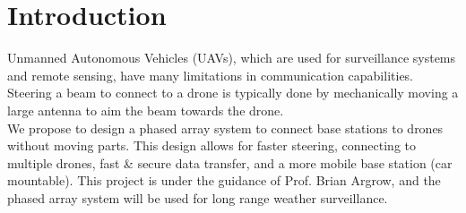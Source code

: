 \documentclass[UROP.tex]{subfiles}
\begin{document}
\bigskip
\section{\Large Introduction}
	Unmanned Autonomous Vehicles (UAVs), which are used for surveillance systems and remote sensing, have many limitations in communication capabilities.  Steering a beam to connect to a drone is typically done by mechanically moving a large antenna to aim the beam towards the drone.  \\
	
	We propose to design a phased array system to connect base stations to drones without moving parts.  This design allows for faster steering, connecting to multiple drones, fast \& secure data transfer, and a more mobile base station (car mountable).  This project is under the guidance of Prof. Brian Argrow, and the phased array system will be used for long range weather surveillance.
\end{document}
